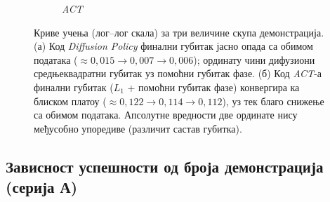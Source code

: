 \documentclass[12pt, a4paper]{article}
\begin{document}
\begin{figure}[htbp]
\begin{subfigure}{0.49\linewidth}
        \caption{\textit{ACT}}
        \label{fig:kriva_act}
    \end{subfigure}
    \caption[Криве учења за три величине скупа демонстрација]{Криве учења (лог–лог скала) за три величине скупа демонстрација. (а) Код \textit{Diffusion Policy} финални губитак јасно опада са обимом података ($\approx 0{,}015 \to 0{,}007 \to 0{,}006$); ординату чини дифузиони средњеквадратни губитак уз помоћни губитак фазе. (б) Код \textit{ACT}-а финални губитак ($L_1$ + помоћни губитак фазе) конвергира ка блиском платоу ($\approx 0{,}122 \to 0{,}114 \to 0{,}112$), уз тек благо снижење са обимом података. Апсолутне вредности две ординате нису међусобно упоредиве (различит састав губитка).}
    \label{fig:rez_krive_ucenja}
\end{figure}

\subsection{Зависност успешности од броја демонстрација (серија А)}
\label{subsec:rez_serija_a}
\end{document}
